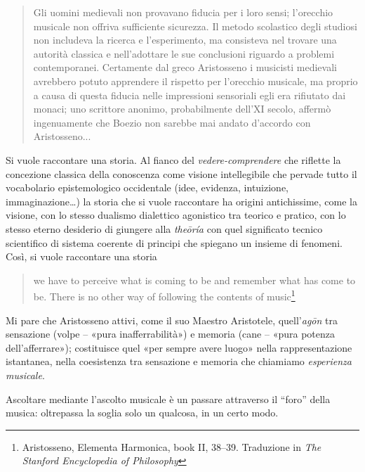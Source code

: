 \documentclass{../../lib/gs}
\begin{document}
\begin{quote}
\begin{sf}
\small
Gli uomini medievali non provavano fiducia per i loro sensi; l'orecchio musicale
non offriva sufficiente sicurezza. Il metodo scolastico degli studiosi non
includeva la ricerca e l'esperimento, ma consisteva nel trovare una autorità
classica e nell'adottare le sue conclusioni riguardo a problemi contemporanei.
Certamente dal greco Aristosseno i musicisti medievali avrebbero potuto
apprendere il rispetto per l'orecchio musicale, ma proprio a causa di questa
fiducia nelle impressioni sensoriali egli era rifiutato dai monaci; uno
scrittore anonimo, probabilmente dell'XI secolo, affermò ingenuamente che Boezio
non sarebbe mai andato d'accordo con Aristosseno... \cite{sachs1996}
\end{sf}
\end{quote}

Si vuole raccontare una storia. Al fianco del \emph{vedere-comprendere} che
riflette la concezione classica della conoscenza come visione intellegibile che
pervade tutto il vocabolario epistemologico occidentale (idee, evidenza,
intuizione, immaginazione\ldots) la storia che si vuole raccontare ha origini
antichissime, come la visione, con lo stesso dualismo dialettico agonistico tra
teorico e pratico, con lo stesso eterno desiderio di giungere alla \emph{theōría}
con quel significato tecnico scientifico di sistema coerente di principi che
spiegano un insieme di fenomeni. Così, si vuole raccontare una storia %

\begin{quote}
\begin{sf}
\small
we have to perceive what is coming to be and remember what has come to be. There
is no other way of following the contents of music\footnote{Aristosseno, Elementa
Harmonica, book II, 38–39. Traduzione in \emph{The Stanford Encyclopedia of
Philosophy}}
\end{sf}
\end{quote}

Mi pare che Aristosseno attivi, come il suo Maestro Aristotele, quell'\emph{agōn}
\cite{ronchi2001} tra sensazione (volpe – «pura inafferrabilità») e memoria (cane
– «pura potenza dell'afferrare»); costituisce quel «per sempre avere luogo» nella
rappresentazione istantanea, nella coesistenza tra sensazione e memoria che
chiamiamo \emph{esperienza musicale}.

Ascoltare mediante l'ascolto musicale è un passare attraverso il “foro” della
musica: oltrepassa la soglia solo un qualcosa, in un certo modo.
\end{document}

